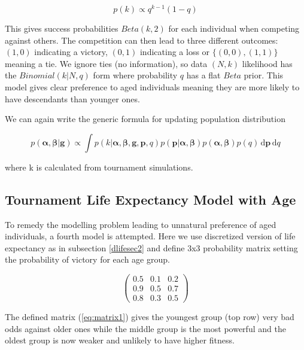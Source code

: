\documentclass{article}
\begin{document}
\begin{equation}
p(k) \propto q^{k-1} (1-q)
\end{equation}

This gives success probabilities $Beta(k,2)$ for each individual when competing against others. The competition can then lead to three different outcomes:  $(1,0)$ indicating a victory, $(0,1)$ indicating a loss or $\{(0,0), (1,1)\}$ meaning a tie. We ignore ties (no information), so data $(N,k)$ likelihood has the $Binomial(k|N, q)$ form where probability $q$ has a flat $Beta$ prior. This model gives clear preference to aged individuals meaning they are more likely to have descendants than younger ones.

We can again write the generic formula for updating population distribution

\begin{equation}
p(\bm{\alpha},\bm{\beta}|\mathbf{g}) \propto \int p(k|\bm{\alpha},\bm{\beta},\mathbf{g},\mathbf{p},q) p(\mathbf{p}|\bm{\alpha},\bm{\beta}) p(\bm{\alpha},\bm{\beta})p(q) \, \mathrm{d}\mathbf{p} \,  \mathrm{d}q
\end{equation}

where k is calculated from tournament simulations.

\subsection{Tournament Life Expectancy Model with Age}

To remedy the modelling problem leading to unnatural preference of aged individuals, a fourth model is attempted. Here we use discretized version of life expectancy as in subsection  \ref{dlifesec2} and define 3x3 probability matrix setting the  probability of victory for each age group.

\begin{equation}
\label{eq:matrix1}
\begin{pmatrix} 
0.5 & 0.1 & 0.2 \\ 
0.9 & 0.5 & 0.7 \\ 
0.8 & 0.3 & 0.5 
\end{pmatrix}
\end{equation}

The defined matrix (\ref{eq:matrix1}) gives the youngest group (top row) very bad odds against older ones while the middle group is the most powerful and the oldest group is now weaker and unlikely to have higher fitness.
\end{document}
